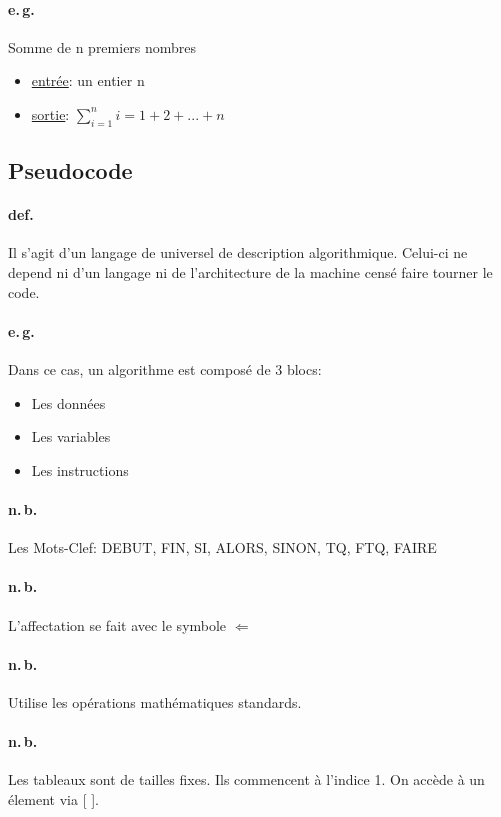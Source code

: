 \documentclass{report}
\begin{document}
  \paragraph{e.\,g.} Somme de n premiers nombres
  \begin{itemize}
    \item \underline{entrée}: un entier n
    \item \underline{sortie}: $\sum_{i=1}^n i = 1 + 2 + ... + n$
  \end{itemize}

\subsection{Pseudocode}

  \paragraph{def.} Il s'agit d'un langage de universel de description algorithmique. Celui-ci ne depend ni d'un langage ni de l'architecture de la machine censé faire tourner le code.

  \paragraph{e.\,g.} Dans ce cas, un algorithme est composé de 3 blocs:
  \begin{itemize}
    \item Les données
    \item Les variables
    \item Les instructions
  \end{itemize}

  \paragraph{n.\,b.} Les Mots-Clef: DEBUT, FIN, SI, ALORS, SINON, TQ, FTQ, FAIRE

  \paragraph{n.\,b.} L'affectation se fait avec le symbole $\Leftarrow$

  \paragraph{n.\,b.} Utilise les opérations mathématiques standards.

  \paragraph{n.\,b.} Les tableaux sont de tailles fixes. Ils commencent à l'indice 1. On accède à un élement via [ ].
\end{document}
